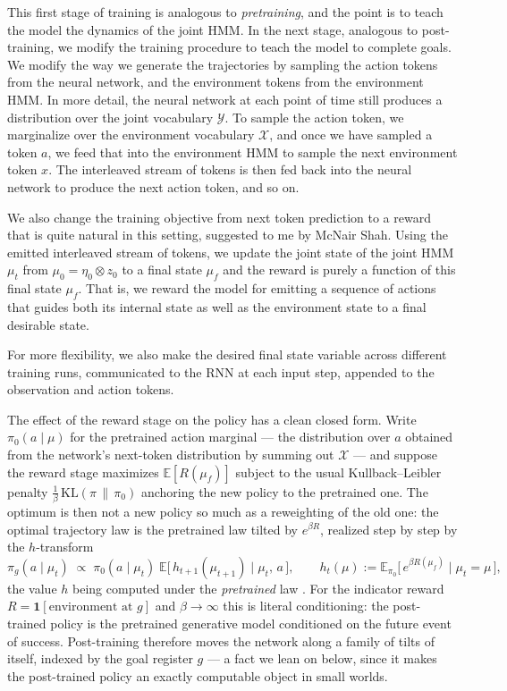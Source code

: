 \documentclass[11pt]{article}
\begin{document}
This first stage of training is analogous to \emph{pretraining}, and the point is to teach the model the dynamics of the joint HMM. In the next stage, analogous to post-training, we modify the training procedure to teach the model to complete goals. We modify the way we generate the trajectories by sampling the action tokens from the neural network, and the environment tokens from the environment HMM. In more detail, the neural network at each point of time still produces a distribution over the joint vocabulary $\mathcal Y$. To sample the action token, we marginalize over the environment vocabulary $\mathcal X$, and once we have sampled a token $a$, we feed that into the environment HMM to sample the next environment token $x$. The interleaved stream of tokens is then fed back into the neural network to produce the next action token, and so on. 

We also change the training objective from next token prediction to a reward that is quite natural in this setting, suggested to me by McNair Shah. Using the emitted interleaved stream of tokens, we update the joint state of the joint HMM $\mu_t$ from $\mu_0 = \eta_0\otimes z_0$ to a final state $\mu_f$ and the reward is purely a function of this final state $\mu_f$. That is, we reward the model for emitting a sequence of actions that guides both its internal state as well as the environment state to a final desirable state.

For more flexibility, we also make the desired final state variable across different training runs, communicated to the RNN at each input step, appended to the observation and action tokens.

The effect of the reward stage on the policy has a clean closed form. Write $\pi_0(a \mid \mu)$ for the pretrained action marginal --- the distribution over $a$ obtained from the network's next-token distribution by summing out $\mathcal X$ --- and suppose the reward stage maximizes $\mathbb E[R(\mu_f)]$ subject to the usual Kullback--Leibler penalty $\tfrac1\beta\,\mathrm{KL}(\pi \,\|\, \pi_0)$ anchoring the new policy to the pretrained one. The optimum is then not a new policy so much as a reweighting of the old one: the optimal trajectory law is the pretrained law tilted by $e^{\beta R}$, realized step by step by the $h$-transform
\begin{equation}
\tag{$\pi_g$}\label{eq:tilt}
\pi_g(a \mid \mu_t) \;\propto\; \pi_0(a \mid \mu_t)\; \mathbb E\big[\,h_{t+1}(\mu_{t+1}) \;\big|\; \mu_t,\, a\,\big],
\qquad
h_t(\mu) := \mathbb E_{\pi_0}\big[\,e^{\beta R(\mu_f)} \;\big|\; \mu_t = \mu\,\big],
\end{equation}
the value $h$ being computed under the \emph{pretrained} law \citep{todorov2009, korbak2022}. For the indicator reward $R = \mathbf 1[\text{environment at } g]$ and $\beta \to \infty$ this is literal conditioning: the post-trained policy is the pretrained generative model conditioned on the future event of success. Post-training therefore moves the network along a family of tilts of itself, indexed by the goal register $g$ --- a fact we lean on below, since it makes the post-trained policy an exactly computable object in small worlds.
\end{document}
